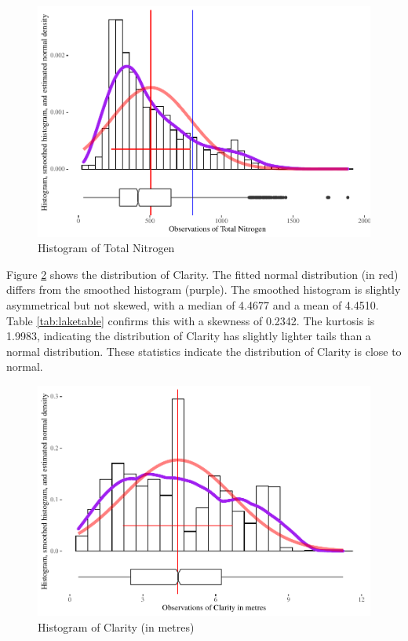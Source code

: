 \documentclass[
]{article}
\begin{document}
\begin{figure}
\centering
\includegraphics{Final-Report_files/figure-latex/TNhist-1.pdf}
\caption{\label{fig:TNhist}Histogram of Total Nitrogen}
\end{figure}

Figure \ref{fig:SECCHIhist} shows the distribution of Clarity. The fitted normal distribution (in red) differs from the smoothed histogram (purple). The smoothed histogram is slightly asymmetrical but not skewed, with a median of 4.4677 and a mean of 4.4510. Table \ref{tab:laketable} confirms this with a skewness of 0.2342. The kurtosis is 1.9983, indicating the distribution of Clarity has slightly lighter tails than a normal distribution. These statistics indicate the distribution of Clarity is close to normal.

\begin{figure}
\centering
\includegraphics{Final-Report_files/figure-latex/SECCHIhist-1.pdf}
\caption{\label{fig:SECCHIhist}Histogram of Clarity (in metres)}
\end{figure}
\end{document}
